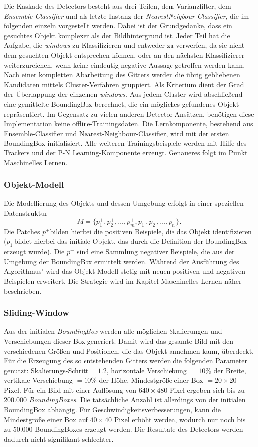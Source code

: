 Die Kaskade des Detectors besteht aus drei Teilen, dem Varianzfilter, dem \textit{Ensemble-Classifier} und als letzte Instanz der \textit{NearestNeigbour-Classifier}, die im folgenden einzeln vorgestellt werden. Dabei ist der Grundgedanke, dass ein gesuchtes Objekt komplexer als der Bildhintergrund ist. Jeder Teil hat die Aufgabe, die \textit{windows} zu Klassifizieren und entweder zu verwerfen, da sie nicht dem gesuchten Objekt entsprechen können, oder an den nächsten Klassifizierer weiterzureichen, wenn keine eindeutig negative Aussage getroffen werden kann. Nach einer kompletten Abarbeitung des Gitters werden die übrig gebliebenen Kandidaten mittels Cluster-Verfahren gruppiert. Als Kriterium dient der Grad der Überlappung der einzelnen \textit{windows.} Aus jedem Cluster wird abschließend eine gemittelte BoundingBox berechnet, die ein mögliches gefundenes Objekt repräsentiert. Im Gegensatz zu vielen anderen Detector-Ansätzen, benötigen diese Implementation keine offline-Trainingsdaten. Die Lernkomponente, bestehend aus Ensemble-Classifier und Nearest-Neighbour-Classifier, wird mit der ersten BoundingBox initialisiert. Alle weiteren Trainingsbeispiele werden mit Hilfe des Trackers und der P-N Learning-Komponente erzeugt. Genaueres folgt im Punkt Maschinelles Lernen.

\subsubsection{Objekt-Modell}
Die Modellierung des Objekts und dessen Umgebung erfolgt in einer speziellen Datenstruktur
\[
M=\{p_{1}^{+},p_{2}^{+},\dots,p_{m}^{+},p_{1}^{-},p_{2}^{-},\dots,p_{n}^{-}\}.
\]
Die Patches $p^{+}$bilden hierbei die positiven Beispiele, die das Objekt identifizieren ($p_{1}^{+}$bildet hierbei das initiale Objekt, das durch die Definition der BoundingBox erzeugt wurde). Die $p^{-}$ sind eine Sammlung negativer Beispiele, die aus der Umgebung der BoundingBox ermittelt werden. Während der Ausführung des Algorithmus' wird das Objekt-Modell stetig mit neuen positiven und negativen Beispielen erweitert. Die Strategie wird im Kapitel Maschinelles Lernen näher beschrieben.

\subsubsection{Sliding-Window}
Aus der initialen \textit{BoundingBox} werden alle möglichen Skalierungen und Verschiebungen dieser Box generiert. Damit wird das gesamte Bild mit den verschiedenen Größen und Positionen, die das Objekt annehmen kann, überdeckt. Für die Erzeugung des so entstehenden Gitters werden die folgenden Parameter genutzt: Skalierungs-Schritt$=1.2$, horizontale Verschiebung $=10\%$ der Breite, vertikale Verschiebung $=10\%$ der Höhe, Mindestgröße einer Box $=20\times20$ Pixel. Für ein Bild mit einer Auflösung von $640\times480$ Pixel ergeben sich bis zu $200.000$ \textit{BoundingBoxes}. Die tatsächliche Anzahl ist allerdings von der initialen BoundingBox abhängig. Für Geschwindigkeitsverbesserungen, kann die Mindestgröße einer Box auf $40\times40$ Pixel erhöht werden, wodurch nur noch bis zu $50.000$ BoundingBoxes erzeugt werden. Die Resultate des Detectors werden dadurch nicht signifikant schlechter.

